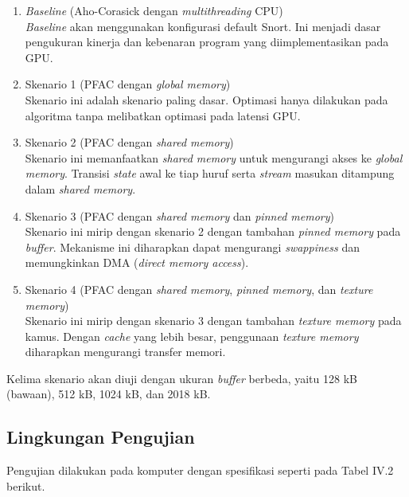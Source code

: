     \begin{enumerate}
      
      \item \emph{Baseline} (Aho-Corasick dengan \emph{multithreading} CPU) \\
      \emph{Baseline} akan menggunakan konfigurasi default Snort. Ini menjadi dasar pengukuran kinerja dan kebenaran program yang diimplementasikan pada GPU.

      \item Skenario 1 (PFAC dengan \emph{global memory}) \\
      Skenario ini adalah skenario paling dasar. Optimasi hanya dilakukan pada algoritma tanpa melibatkan optimasi pada latensi GPU.

      \item Skenario 2 (PFAC dengan \emph{shared memory}) \\
      Skenario ini memanfaatkan \emph{shared memory} untuk mengurangi akses ke \emph{global memory}. Transisi \emph{state} awal ke tiap huruf serta \emph{stream} masukan ditampung dalam \emph{shared memory}.

      \item Skenario 3 (PFAC dengan \emph{shared memory} dan \emph{pinned memory}) \\
      Skenario ini mirip dengan skenario 2 dengan tambahan \emph{pinned memory} pada \emph{buffer}. Mekanisme ini diharapkan dapat mengurangi \emph{swappiness} dan memungkinkan DMA (\emph{direct memory access}).

      \item Skenario 4 (PFAC dengan \emph{shared memory}, \emph{pinned memory}, dan \emph{texture memory}) \\
      Skenario ini mirip dengan skenario 3 dengan tambahan \emph{texture memory} pada kamus. Dengan \emph{cache} yang lebih besar, penggunaan \emph{texture memory} diharapkan mengurangi transfer memori.

    \end{enumerate}

    Kelima skenario akan diuji dengan ukuran \emph{buffer} berbeda, yaitu 128 kB (bawaan), 512 kB, 1024 kB, dan 2018 kB.

  \subsection{Lingkungan Pengujian}

    Pengujian dilakukan pada komputer dengan spesifikasi seperti pada Tabel IV.2 berikut.
    
